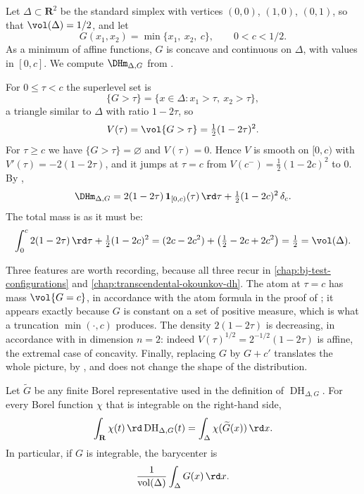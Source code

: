 \begin{example}
\label{ex:dh-simplex}
Let $\Delta\subset\mathbf R^2$ be the standard simplex with vertices
$(0,0)$, $(1,0)$, $(0,1)$, so that $\vol(\Delta)=1/2$, and let
\[
 G(x_1,x_2)=\min\{x_1,\ x_2,\ c\},\qquad 0<c<1/2 .
\]
As a minimum of affine functions, $G$ is concave and continuous on $\Delta$,
with values in $[0,c]$.  We compute $\DHm_{\Delta,G}$ from
.

For $0\leq\tau<c$ the superlevel set is
\[
 \{G>\tau\}=\{x\in\Delta:x_1>\tau,\ x_2>\tau\},
\]
a triangle similar to $\Delta$ with ratio $1-2\tau$, so
\[
 V(\tau)=\vol\{G>\tau\}=\tfrac12(1-2\tau)^2 .
\]
For $\tau\geq c$ we have $\{G>\tau\}=\varnothing$ and $V(\tau)=0$.  Hence $V$
is smooth on $[0,c)$ with $V'(\tau)=-2(1-2\tau)$, and it jumps at $\tau=c$
from $V(c^-)=\tfrac12(1-2c)^2$ to $0$.  By ,
\[
 \DHm_{\Delta,G}
 =2(1-2\tau)\,\mathbf 1_{[0,c)}(\tau)\,\rd\tau
 +\tfrac12(1-2c)^2\,\delta_c .
\]
The total mass is as it must be:
\[
 \int_0^c2(1-2\tau)\,\rd\tau+\tfrac12(1-2c)^2
 =(2c-2c^2)+\bigl(\tfrac12-2c+2c^2\bigr)=\tfrac12=\vol(\Delta).
\]

Three features are worth recording, because all three recur in
\cref{chap:bj-test-configurations} and
\cref{chap:transcendental-okounkov-dh}.  The atom at $\tau=c$ has mass
$\vol\{G=c\}$, in accordance with the atom formula in the proof of
; it appears exactly because $G$ is constant on a set of
positive measure, which is what a truncation $\min(\cdot,c)$ produces.  The
density $2(1-2\tau)$ is decreasing, in accordance with
 in dimension $n=2$: indeed
$V(\tau)^{1/2}=2^{-1/2}(1-2\tau)$ is affine, the extremal case of concavity.
Finally, replacing $G$ by $G+c'$ translates the whole picture, by
, and does not change the shape of the distribution.
\end{example}

\begin{lemma}\label{lem:dh-moments}
Let $\widetilde G$ be any finite Borel representative used in the definition
of $\operatorname{DH}_{\Delta,G}$.  For every Borel function $\chi$ that is
integrable on the right-hand side,
\[
 \int_{\mathbf R}\chi(t)\,\rd \operatorname{DH}_{\Delta,G}(t)
 =\int_\Delta\chi(\widetilde G(x))\,\rd x.
\]
In particular, if $G$ is integrable, the barycenter is
\[
 \frac{1}{\operatorname{vol}(\Delta)}
 \int_\Delta G(x)\,\rd x.
\]
\end{lemma}

